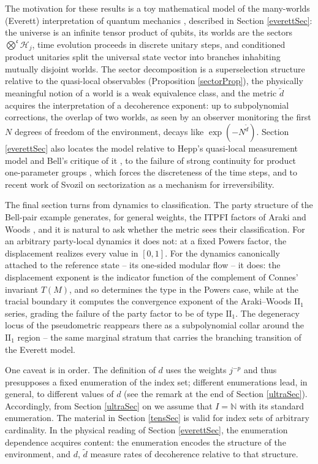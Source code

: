 \documentclass[twoside,11pt,letter]{article}
\def\bN{\mathbb{N}}
\def\cH{{\mathcal{H}}}
\def\fc{{\mathfrak{c}}}
\theoremstyle{definition}
\theoremstyle{definition}
\theoremstyle{plain}
\begin{document}
The motivation for these results is a toy mathematical model of the many-worlds (Everett) interpretation of quantum mechanics \cite{E57}, described in Section \ref{everettSec}: the universe is an infinite tensor product of qubits, its worlds are the sectors $\bigotimes^\fc\cH_j$, time evolution proceeds in discrete unitary steps, and conditioned product unitaries split the universal state vector into branches inhabiting mutually disjoint worlds. The sector decomposition is a superselection structure relative to the quasi-local observables (Proposition \ref{sectorProp}), the physically meaningful notion of a world is a weak equivalence class, and the metric $\tilde d$ acquires the interpretation of a decoherence exponent: up to subpolynomial corrections, the overlap of two worlds, as seen by an observer monitoring the first $N$ degrees of freedom of the environment, decays like $\exp(-N^{\tilde d})$. Section \ref{everettSec} also locates the model relative to Hepp's quasi-local measurement model \cite{H72} and Bell's critique of it \cite{B75}, to the failure of strong continuity for product one-parameter groups \cite{R74}, which forces the discreteness of the time steps, and to recent work of Svozil \cite{S26} on sectorization as a mechanism for irreversibility.

The final section turns from dynamics to classification. The party structure of the Bell-pair example generates, for general weights, the ITPFI factors of Araki and Woods \cite{AW68}, and it is natural to ask whether the metric sees their classification. For an arbitrary party-local dynamics it does not: at a fixed Powers factor, the displacement realizes every value in $[0,1]$. For the dynamics canonically attached to the reference state -- its one-sided modular flow -- it does: the displacement exponent is the indicator function of the complement of Connes' invariant $T(M)$, and so determines the type in the Powers case, while at the tracial boundary it computes the convergence exponent of the Araki--Woods $\mathrm{II}_1$ series, grading the failure of the party factor to be of type $\mathrm{II}_1$. The degeneracy locus of the pseudometric reappears there as a subpolynomial collar around the $\mathrm{II}_1$ region -- the same marginal stratum that carries the branching transition of the Everett model.

One caveat is in order. The definition of $d$ uses the weights $j^{-p}$ and thus presupposes a fixed enumeration of the index set; different enumerations lead, in general, to different values of $d$ (see the remark at the end of Section \ref{ultraSec}). Accordingly, from Section \ref{ultraSec} on we assume that $I=\bN$ with its standard enumeration. The material in Section \ref{tensSec} is valid for index sets of arbitrary cardinality. In the physical reading of Section \ref{everettSec}, the enumeration dependence acquires content: the enumeration encodes the structure of the environment, and $d$, $\tilde d$ measure rates of decoherence relative to that structure.
\end{document}
